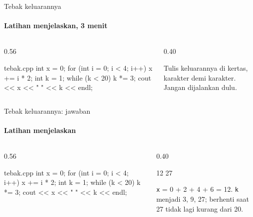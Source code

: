 \documentclass[t]{beamer}
\begin{document}
\begin{frame}[fragile]{Tebak keluarannya}
\framesubtitle{Latihan menjelaskan, 3 menit}
\begin{columns}[T]
\begin{column}{0.56\textwidth}
\begin{Kode}[]{tebak.cpp}
int x = 0;
for (int i = 0; i < 4; i++) {
    x += i * 2;
}
int k = 1;
while (k < 20) {
    k *= 3;
}
cout << x << " " << k << endl;
\end{Kode}
\end{column}
\begin{column}{0.40\textwidth}
\begin{Catatan}
Tulis keluarannya di kertas, karakter demi karakter. Jangan dijalankan dulu.
\end{Catatan}
\end{column}
\end{columns}
\end{frame}

\begin{frame}[fragile]{Tebak keluarannya: jawaban}
\framesubtitle{Latihan menjelaskan}
\begin{columns}[T]
\begin{column}{0.56\textwidth}
\begin{Kode}[]{tebak.cpp}
int x = 0;
for (int i = 0; i < 4; i++) {
    x += i * 2;
}
int k = 1;
while (k < 20) {
    k *= 3;
}
cout << x << " " << k << endl;
\end{Kode}
\end{column}
\begin{column}{0.40\textwidth}
\begin{Keluaran}[]
12 27
\end{Keluaran}
\begin{Catatan}
\texttt{x} = 0 + 2 + 4 + 6 = 12. \texttt{k} menjadi 3, 9, 27; berhenti saat 27 tidak lagi kurang dari 20.
\end{Catatan}
\end{column}
\end{columns}
\end{frame}
\end{document}
